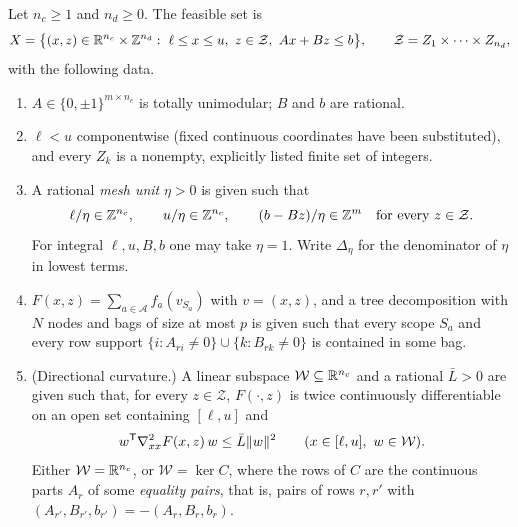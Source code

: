 \begin{definition}\label{def:tu-model}
Let $n_c\ge1$ and $n_d\ge0$. The feasible set is
\[
X=\bigl\{(x,z)\in\mathbb R^{n_c}\times\mathbb Z^{n_d}:\ \ell\le x\le u,\ z\in\mathcal Z,\
Ax+Bz\le b\bigr\},\qquad \mathcal Z=Z_1\times\dots\times Z_{n_d},
\]
with the following data.
\begin{enumerate}[label=(\roman*)]
\item $A\in\{0,\pm1\}^{m\times n_c}$ is totally unimodular; $B$ and $b$ are
rational.
\item $\ell<u$ componentwise (fixed continuous coordinates have been
substituted), and every $Z_k$ is a nonempty, explicitly listed finite set of
integers.
\item A rational \emph{mesh unit} $\eta>0$ is given such that
\begin{equation}\label{eq:tu-align}
\ell/\eta\in\mathbb Z^{n_c},\qquad u/\eta\in\mathbb Z^{n_c},\qquad
(b-Bz)/\eta\in\mathbb Z^m\quad\text{for every }z\in\mathcal Z .
\end{equation}
For integral $\ell,u,B,b$ one may take $\eta=1$. Write $\Delta_\eta$ for the
denominator of $\eta$ in lowest terms.
\item $F(x,z)=\sum_{a\in\mathcal A}f_a(v_{S_a})$ with $v=(x,z)$, and a tree
decomposition with $N$ nodes and bags of size at most $p$ is given such that
every scope $S_a$ and every row support
$\{i:A_{ri}\ne0\}\cup\{k:B_{rk}\ne0\}$ is contained in some bag.
\item (Directional curvature.) A linear subspace $\mathcal W\subseteq\mathbb R^{n_c}$
and a rational $\bar L>0$ are given such that, for every $z\in\mathcal Z$,
$F(\cdot,z)$ is twice continuously differentiable on an open set containing
$[\ell,u]$ and
\begin{equation}\label{eq:tu-curv}
w^{\mathsf T}\nabla^2_{xx}F(x,z)\,w\le\bar L\lVert w\rVert^2\qquad
(x\in[\ell,u],\ w\in\mathcal W).
\end{equation}
Either $\mathcal W=\mathbb R^{n_c}$, or $\mathcal W=\ker C$, where the rows of $C$
are the continuous parts $A_r$ of some \emph{equality pairs}, that is, pairs
of rows $r,r'$ with $(A_{r'},B_{r'},b_{r'})=-(A_r,B_r,b_r)$.
\end{enumerate}
\end{definition}

